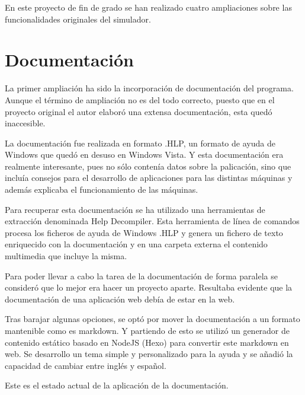 

En este proyecto de fin de grado se han realizado cuatro ampliaciones sobre las funcionalidades originales 
del simulador. 

\section{Documentación}
\label{6:sec1}

La primer ampliación ha sido la incorporación de documentación del programa. Aunque el
término de ampliación no es del todo correcto, puesto que en el proyecto original el autor
elaboró una extensa documentación, esta quedó inaccesible.

\bigskip
La documentación fue realizada en formato .HLP, un formato de ayuda de Windows que quedó
en desuso en Windows Vista. Y esta documentación era realmente interesante, pues no sólo
contenía datos sobre la palicación, sino que incluía consejos para el desarrollo de 
aplicaciones para las distintas máquinas y además explicaba el funcionamiento de las máquinas.

\bigskip
Para recuperar esta documentación se ha utilizado una herramientas de extracción denominada
Help Decompiler. Esta herramienta de línea de comandos procesa los ficheros de ayuda de
Windows .HLP y genera un fichero de texto enriquecido con la documentación y en una carpeta
externa el contenido multimedia que incluye la misma.

\bigskip
Para poder llevar a cabo la tarea de la documentación de forma paralela se consideró que lo mejor era
hacer un proyecto aparte. Resultaba evidente que la documentación de una aplicación web debía de estar en la
web. 

\bigskip
Tras barajar algunas opciones, se optó por mover la documentación a un formato mantenible como 
es markdown. Y partiendo de esto se utilizó un generador de contenido estático basado en NodeJS (Hexo)
para convertir este markdown en web. Se desarrollo un tema simple y personalizado para la ayuda y se 
añadió la capacidad de cambiar entre inglés y español.

\bigskip
Este es el estado actual de la aplicación de la documentación.

